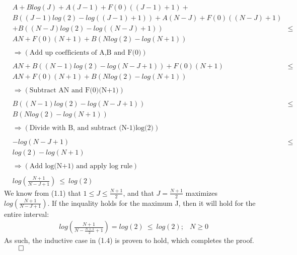 \begin{equation*}	
\begin{aligned}
&A + Blog(J) + A(J-1) + F(0)((J-1)+1) +                  & \\
&B((J-1)log(2)-log((J-1)+1)) + A(N-J) + F(0)((N-J)+1)    & \\
& + B((N-J)log(2)-log((N-J)+1))                          &\le  \\
&AN + F(0)(N+1) + B(Nlog(2)-log(N+1))                    & \\
& & \\
&\Rightarrow (\text{Add up coefficients of A,B and F(0)})& \\
& & \\
&AN + B((N-1)log(2)-log(N-J+1)) + F(0)(N+1)              &\le \\
&AN + F(0)(N+1) + B(Nlog(2)-log(N+1))                    &  \\	
& & \\
&\Rightarrow (\text{Subtract AN and F(0)(N+1)})          & \\
& & \\	
&B((N-1)log(2)-log(N-J+1))                               &\le \\
&B(Nlog(2)-log(N+1))                                     &  \\	
& & \\
&\Rightarrow (\text{Divide with B, and subtract (N-1)log(2)})      & \\
& & \\
&-log(N-J+1)                                             &\le \\
&log(2)-log(N+1)                                         &  \\	
& & \\
&\Rightarrow (\text{Add log(N+1) and apply log rule})    & \\
& & \\			
&log(\frac{N+1}{N-J+1}) \  \le \  log(2)                 & 	
\end{aligned}
\end{equation*}
We know from (1.1) that $1 \le J \le \frac{N+1}{2}$, and that $J=\frac{N+1}{2}$ maximizes $log(\frac{N+1}{N-J+1})$. If the inquality holds for the maximum J, then it will hold for the entire interval: 
\begin{equation*}	
\begin{aligned}	
&log(\frac{N+1}{N-\frac{N+1}{2}+1}) = log(2) \  \le \  log(2);  & N \ge 0 	
\end{aligned}
\end{equation*}
As such, the inductive case in (1.4) is proven to hold, which completes the proof. $\qed$











